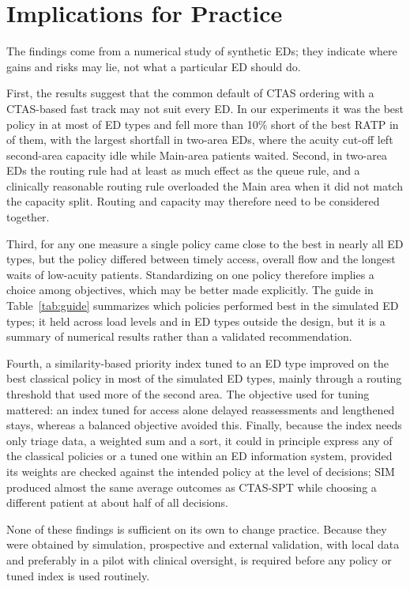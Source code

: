 \section{Implications for Practice}
\label{sec:implications}

The findings come from a numerical study of synthetic EDs; they indicate where gains and risks may lie, not what a particular ED should do.

First, the results suggest that the common default of CTAS ordering with a CTAS-based fast track may not suit every ED. In our experiments it was the best policy in at most \DefaultIsBestRatp{} of \NEdTypes{} ED types and fell more than 10\% short of the best RATP in \DefaultRatpNGtTen{} of them, with the largest shortfall in two-area EDs, where the acuity cut-off left second-area capacity idle while Main-area patients waited. Second, in two-area EDs the routing rule had at least as much effect as the queue rule, and a clinically reasonable routing rule overloaded the Main area when it did not match the capacity split. Routing and capacity may therefore need to be considered together.

Third, for any one measure a single policy came close to the best in nearly all ED types, but the policy differed between timely access, overall flow and the longest waits of low-acuity patients. Standardizing on one policy therefore implies a choice among objectives, which may be better made explicitly. The guide in Table~\ref{tab:guide} summarizes which policies performed best in the simulated ED types; it held across load levels and in ED types outside the design, but it is a summary of numerical results rather than a validated recommendation.

Fourth, a similarity-based priority index tuned to an ED type improved on the best classical policy in most of the simulated ED types, mainly through a routing threshold that used more of the second area. The objective used for tuning mattered: an index tuned for access alone delayed reassessments and lengthened stays, whereas a balanced objective avoided this. Finally, because the index needs only triage data, a weighted sum and a sort, it could in principle express any of the classical policies or a tuned one within an ED information system, provided its weights are checked against the intended policy at the level of decisions; SIM produced almost the same average outcomes as CTAS-SPT while choosing a different patient at about half of all decisions.

None of these findings is sufficient on its own to change practice. Because they were obtained by simulation, prospective and external validation, with local data and preferably in a pilot with clinical oversight, is required before any policy or tuned index is used routinely.


